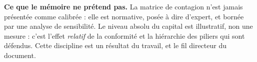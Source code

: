 \begin{attention}
\textbf{Ce que le mémoire ne prétend pas.} La matrice de contagion n'est jamais présentée
comme calibrée : elle est normative, posée à dire d'expert, et bornée par une analyse de
sensibilité. Le
niveau absolu du capital est illustratif, non une mesure : c'est l'effet \emph{relatif} de la
conformité et la hiérarchie des piliers qui sont défendus. Cette discipline est un
résultat du travail, et le fil directeur du document.
\end{attention}


